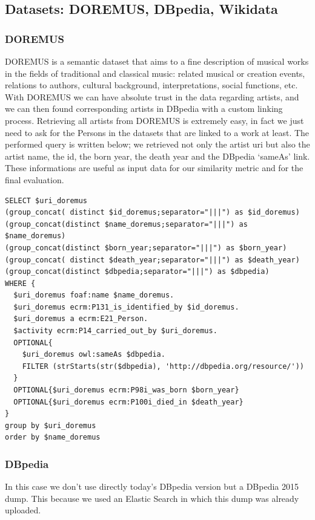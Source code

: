 \documentclass[paper=a4, fontsize=11pt]{scrartcl}
\begin{document}
\subsection{Datasets: DOREMUS, DBpedia, Wikidata}
\subsubsection{DOREMUS}
DOREMUS is a semantic dataset that aims to a fine description of musical works in the fields of traditional and classical music: related musical or creation events, relations to authors, cultural background, interpretations, social functions, etc.
With DOREMUS we can have absolute trust in the data regarding artists, and we can then found corresponding artists in DBpedia with a custom linking process.
Retrieving all artists from DOREMUS is extremely easy, in fact we just need to ask for the Persons in the datasets that are linked to a work at least. The performed query is written below; we retrieved not only the artist uri but also the artist name, the id, the born year, the death year and the DBpedia `sameAs' link. These informations are useful as input data for our similarity metric and for the final evaluation.

\begin{lstlisting}
SELECT $uri_doremus
(group_concat( distinct $id_doremus;separator="|||") as $id_doremus)
(group_concat(distinct $name_doremus;separator="|||") as $name_doremus)
(group_concat(distinct $born_year;separator="|||") as $born_year)
(group_concat( distinct $death_year;separator="|||") as $death_year)
(group_concat(distinct $dbpedia;separator="|||") as $dbpedia)
WHERE {
  $uri_doremus foaf:name $name_doremus.
  $uri_doremus ecrm:P131_is_identified_by $id_doremus.
  $uri_doremus a ecrm:E21_Person.
  $activity ecrm:P14_carried_out_by $uri_doremus.
  OPTIONAL{
  	$uri_doremus owl:sameAs $dbpedia.
  	FILTER (strStarts(str($dbpedia), 'http://dbpedia.org/resource/'))
  }
  OPTIONAL{$uri_doremus ecrm:P98i_was_born $born_year}
  OPTIONAL{$uri_doremus ecrm:P100i_died_in $death_year}
}
group by $uri_doremus
order by $name_doremus
\end{lstlisting}

\subsubsection{DBpedia}
In this case we don't use directly today's DBpedia version but a DBpedia 2015 dump. This because we used an Elastic Search in which this dump was already uploaded.
\end{document}
